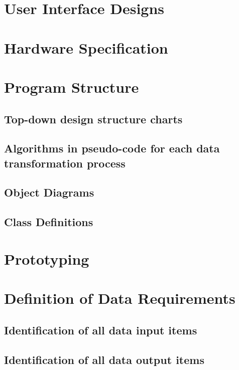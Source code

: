 \section{User Interface Designs}

\section{Hardware Specification}

\section{Program Structure}

\subsection{Top-down design structure charts}

\subsection{Algorithms in pseudo-code for each data transformation process}

\subsection{Object Diagrams}

\subsection{Class Definitions}

\section{Prototyping}

\section{Definition of Data Requirements}

\subsection{Identification of all data input items}

\subsection{Identification of all data output items}

